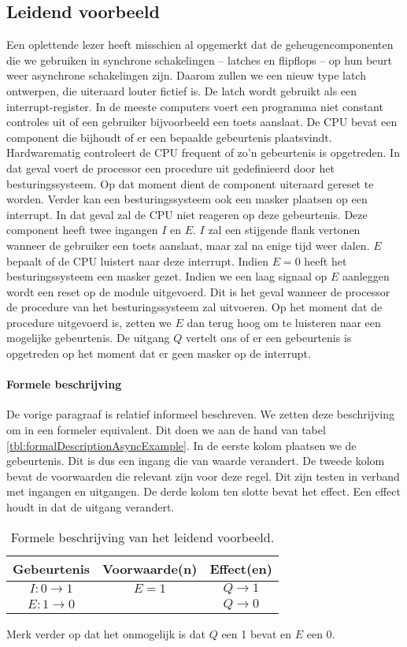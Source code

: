 \subsection{Leidend voorbeeld}
Een oplettende lezer heeft misschien al opgemerkt dat de geheugencomponenten die we gebruiken in synchrone schakelingen -- latches en flipflops -- op hun beurt weer asynchrone schakelingen zijn. Daarom zullen we een nieuw type latch ontwerpen, die uiteraard louter fictief is. De latch wordt gebruikt als een interrupt-register. In de meeste computers voert een programma niet constant controles uit of een gebruiker bijvoorbeeld een toets aanslaat. De CPU bevat een component die bijhoudt of er een bepaalde gebeurtenis plaatsvindt. Hardwarematig controleert de CPU frequent of zo'n gebeurtenis is opgetreden. In dat geval voert de processor een procedure uit gedefinieerd door het besturingssysteem. Op dat moment dient de component uiteraard gereset te worden. Verder kan een besturingssysteem ook een masker plaatsen op een interrupt. In dat geval zal de CPU niet reageren op deze gebeurtenis. Deze component heeft twee ingangen $I$ en $E$. $I$ zal een stijgende flank vertonen wanneer de gebruiker een toets aanslaat, maar zal na enige tijd weer dalen. $E$ bepaalt of de CPU luistert naar deze interrupt. Indien $E=0$ heeft het besturingssysteem een masker gezet. Indien we een laag signaal op $E$ aanleggen wordt een reset op de module uitgevoerd. Dit is het geval wanneer de processor de procedure van het besturingssysteem zal uitvoeren. Op het moment dat de procedure uitgevoerd is, zetten we $E$ dan terug hoog om te luisteren naar een mogelijke gebeurtenis. De uitgang $Q$ vertelt ons of er een gebeurtenis is opgetreden op het moment dat er geen masker op de interrupt.
\paragraph{Formele beschrijving}
De vorige paragraaf is relatief informeel beschreven. We zetten deze beschrijving om in een formeler equivalent. Dit doen we aan de hand van tabel \ref{tbl:formalDescriptionAsyncExample}. In de eerste kolom plaatsen we de gebeurtenis. Dit is dus een ingang die van waarde verandert. De tweede kolom bevat de voorwaarden die relevant zijn voor deze regel. Dit zijn testen in verband met ingangen en uitgangen. De derde kolom ten slotte bevat het effect. Een effect houdt in dat de uitgang verandert.
\begin{table}[hbt]
\centering
\begin{tabular}{c|c|c}
Gebeurtenis&Voorwaarde(n)&Effect(en)\\\hline
$I:0\rightarrow 1$&$E=1$&$Q\rightarrow 1$\\
$E:1\rightarrow 0$&&$Q\rightarrow 0$
\end{tabular}
\caption{Formele beschrijving van het leidend voorbeeld.}
\end{table}
Merk verder op dat het onmogelijk is dat $Q$ een 1 bevat en $E$ een 0.
